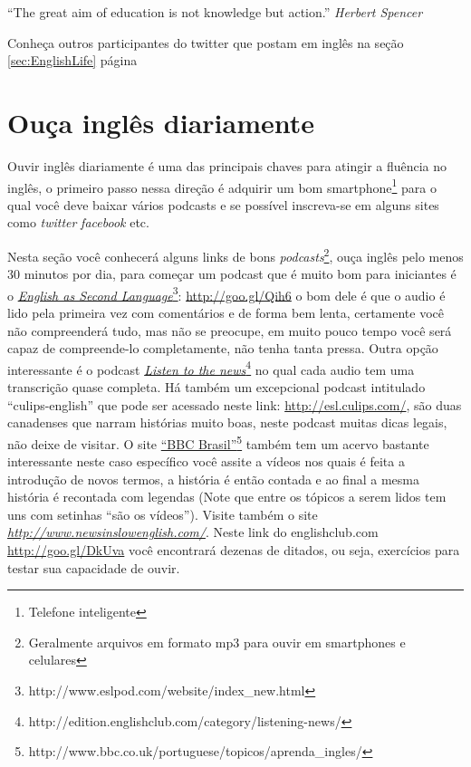 \vspace{0.3\baselineskip}
\noindent
{\footnotesize {} ``The great aim of education is not knowledge but action.''
{\em Herbert Spencer} }

\vspace{0.3\baselineskip}
\noindent
{\footnotesize {} Conheça outros participantes do twitter que postam em inglês na seção
\ref{sec:EnglishLife} página~\pageref{sec:EnglishLife}  }


\section{Ouça inglês diariamente}\label{sec:ouca}

Ouvir inglês diariamente é uma das principais chaves para atingir a fluência no
inglês, o primeiro passo nessa direção é adquirir um bom
smartphone\footnote{Telefone inteligente} para o qual você deve baixar vários
 podcasts e se possível inscreva-se em alguns sites como {\em
twitter} {\em facebook} etc.

Nesta seção você conhecerá alguns links de bons {\em
podcasts}\footnote{Geralmente arquivos em formato mp3 para ouvir em smartphones
e celulares}, ouça inglês pelo menos 30 minutos por dia, para começar um
podcast que é muito bom para iniciantes é o
\href{http://www.eslpod.com/website/index\_new.html}{{\em English as Second Language}}\footnote{http://www.eslpod.com/website/index\_new.html}:
\href{http://goo.gl/Qih6}{http://goo.gl/Qih6} o bom dele é que o audio é lido
pela primeira vez com comentários e de forma bem lenta, certamente você não
compreenderá tudo, mas não se preocupe, em muito pouco tempo você será capaz de
compreende-lo completamente, não tenha tanta pressa.  Outra opção interessante
é o podcast \href{http://edition.englishclub.com/category/listening-news/}{{\em
Listen to the
news}}\footnote{http://edition.englishclub.com/category/listening-news/} no
qual cada audio tem uma transcrição quase completa. Há também um excepcional
podcast intitulado ``culips-english'' que pode ser acessado neste link:
\href{http://esl.culips.com/}{http://esl.culips.com/}, são duas canadenses que
narram histórias muito boas, neste podcast muitas dicas legais, não deixe de
visitar. O site
\href{http://www.bbc.co.uk/portuguese/topicos/aprenda\_ingles/}{``BBC
Brasil''}\footnote{http://www.bbc.co.uk/portuguese/topicos/aprenda\_ingles/}
também tem um acervo bastante interessante neste caso específico você assite
a vídeos nos quais é feita a introdução de novos termos, a história é então
contada e ao final a mesma história é recontada com legendas (Note que
entre os tópicos a serem lidos tem uns com setinhas ``são os vídeos''). Visite
também o site \href{http://www.newsinslowenglish.com/}{\emph{http://www.newsinslowenglish.com/}}.
Neste link do englishclub.com {\footnotesize {}} \href{http://goo.gl/DkUva}{http://goo.gl/DkUva} você encontrará
dezenas de ditados, ou seja, exercícios para testar
sua capacidade de ouvir.

